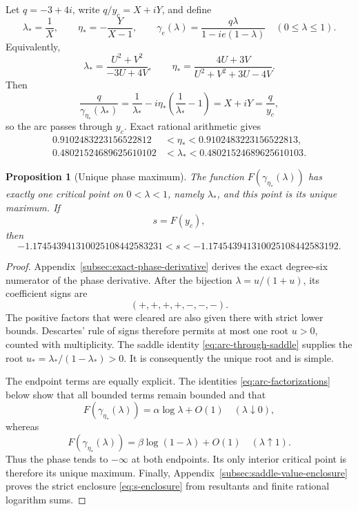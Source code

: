\documentclass[11pt,reqno,letterpaper]{amsart}
\numberwithin{equation}{section}
\newtheorem{proposition}[theorem]{Proposition}
\theoremstyle{definition}
\theoremstyle{remark}
\begin{document}
Let \(q=-3+4i\), write \(q/y_c=X+iY\), and define
\begin{equation}\label{eq:arc-parameters}
 \lambda_*=\frac1X,\qquad
 \eta_*=-\frac{Y}{X-1},\qquad
 \gamma_e(\lambda)=\frac{q\lambda}{1-ie(1-\lambda)}
 \quad(0\leq\lambda\leq1).
\end{equation}
Equivalently,
\begin{equation}\label{eq:arc-parameters-UV}
 \lambda_*=\frac{U^2+V^2}{-3U+4V},\qquad
 \eta_*=\frac{4U+3V}{U^2+V^2+3U-4V}.
\end{equation}
Then
\begin{equation}\label{eq:arc-through-saddle}
 \frac q{\gamma_{\eta_*}(\lambda_*)}
 =\frac1{\lambda_*}
  -i\eta_*\left(\frac1{\lambda_*}-1\right)
 =X+iY=\frac q{y_c},
\end{equation}
so the arc passes through \(y_c\).  Exact rational arithmetic gives
\begin{align}
 0.9102483223156522812&<\eta_*<
 0.9102483223156522813,\label{eq:eta-short-isolation}\\
 0.48021524689625610102&<\lambda_*<
 0.48021524689625610103.\label{eq:lambda-short-isolation}
\end{align}

\begin{proposition}[Unique phase maximum]\label{prop:unique-phase-maximum}
The function \(F(\gamma_{\eta_*}(\lambda))\) has exactly one critical
point on \(0<\lambda<1\), namely \(\lambda_*\), and this point is its
unique maximum.  If
\begin{equation}\label{eq:s-definition}
 s=F(y_c),
\end{equation}
then
\begin{equation}\label{eq:s-enclosure}
 -1.174543941310025108442583231<s<
 -1.174543941310025108442583192.
\end{equation}
\end{proposition}

\begin{proof}
Appendix~\ref{subsec:exact-phase-derivative} derives the exact degree-six
numerator of the phase derivative.  After the bijection
\(\lambda=u/(1+u)\), its coefficient signs are
\[
 (+,+,+,+,-,-,-).
\]
The positive factors that were cleared are also given there with strict
lower bounds.  Descartes' rule of signs therefore permits at most one
root \(u>0\), counted with multiplicity.  The saddle identity
\eqref{eq:arc-through-saddle} supplies the root
\(u_*=\lambda_*/(1-\lambda_*)>0\).  It is consequently the unique root
and is simple.

The endpoint terms are equally explicit.  The identities
\eqref{eq:arc-factorizations} below show that all bounded terms remain
bounded and that
\[
 F(\gamma_{\eta_*}(\lambda))
 =\alpha\log\lambda+O(1)\quad(\lambda\downarrow0),
\]
whereas
\[
 F(\gamma_{\eta_*}(\lambda))
 =\beta\log(1-\lambda)+O(1)\quad(\lambda\uparrow1).
\]
Thus the phase tends to \(-\infty\) at both endpoints.  Its only
interior critical point is therefore its unique maximum.  Finally,
Appendix~\ref{subsec:saddle-value-enclosure} proves the strict enclosure
\eqref{eq:s-enclosure} from resultants and finite rational logarithm
sums.
\end{proof}
\end{document}
